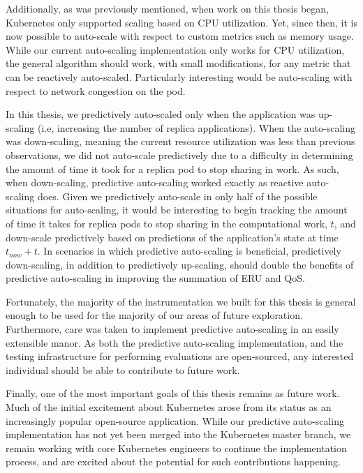 Additionally, as was previously mentioned, when work on this thesis began,
Kubernetes only supported scaling based on CPU utilization. Yet, since then, it
is now possible to auto-scale with respect to custom metrics such as memory
usage. While our current auto-scaling implementation only works for CPU
utilization, the general algorithm should work, with small modifications, for
any metric that can be reactively auto-scaled. Particularly interesting would
be auto-scaling with respect to network congestion on the pod.

In this thesis, we predictively auto-scaled
only when the application was up-scaling (i.e, increasing the number of replica
applications). When the auto-scaling was down-scaling, meaning the current
resource utilization was less than previous observations, we did not auto-scale
predictively due to a difficulty in determining the amount of time it took for a
replica pod to stop sharing in work. As such, when down-scaling, predictive
auto-scaling worked exactly as reactive auto-scaling does. Given we predictively
auto-scale in only half of the possible situations for auto-scaling, it would be
interesting to begin tracking the amount of time it takes for replica pods to
stop sharing in the computational work, $t$, and down-scale predictively based on
predictions of the application's state at time $t_{now} + t$. In scenarios in
which predictive auto-scaling is beneficial, predictively down-scaling, in
addition to predictively up-scaling, should double the benefits of predictive
auto-scaling in improving the summation of ERU and QoS.

Fortunately, the majority of the instrumentation we built for this thesis is general
enough to be used for the majority of our areas of future exploration.
Furthermore, care was taken to implement predictive auto-scaling in an easily
extensible manor. As both the predictive auto-scaling implementation, and the
testing infrastructure for performing evaluations are open-sourced, any
interested individual should be able to contribute to future work.

Finally, one of the most important goals of this thesis remains as future work.
Much of the initial excitement about Kubernetes arose from its status as an
increasingly popular open-source application. While our predictive auto-scaling
implementation has not yet been merged into the Kubernetes master branch, we
remain working with core Kubernetes engineers to continue the implementation
process, and are excited about the potential for such contributions happening.
